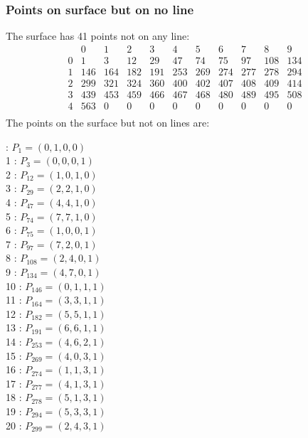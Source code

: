 \documentclass{article}
\begin{document}
{\subsubsection*{Points on surface but on no line}
The surface has 41 points not on any line:\\
$$
\begin{array}{r|*{10}{r}}
 & 0 & 1 & 2 & 3 & 4 & 5 & 6 & 7 & 8 & 9\\
\hline
0 & 1 & 3 & 12 & 29 & 47 & 74 & 75 & 97 & 108 & 134\\
1 & 146 & 164 & 182 & 191 & 253 & 269 & 274 & 277 & 278 & 294\\
2 & 299 & 321 & 324 & 360 & 400 & 402 & 407 & 408 & 409 & 414\\
3 & 439 & 453 & 459 & 466 & 467 & 468 & 480 & 489 & 495 & 508\\
4 & 563 & 0 & 0 & 0 & 0 & 0 & 0 & 0 & 0 & 0\\
\end{array}
$$
The points on the surface but not on lines are:\\
\begin{multicols}{2}
 : $P_{1}=( 0, 1, 0, 0 )$\\
1 : $P_{3}=( 0, 0, 0, 1 )$\\
2 : $P_{12}=( 1, 0, 1, 0 )$\\
3 : $P_{29}=( 2, 2, 1, 0 )$\\
4 : $P_{47}=( 4, 4, 1, 0 )$\\
5 : $P_{74}=( 7, 7, 1, 0 )$\\
6 : $P_{75}=( 1, 0, 0, 1 )$\\
7 : $P_{97}=( 7, 2, 0, 1 )$\\
8 : $P_{108}=( 2, 4, 0, 1 )$\\
9 : $P_{134}=( 4, 7, 0, 1 )$\\
10 : $P_{146}=( 0, 1, 1, 1 )$\\
11 : $P_{164}=( 3, 3, 1, 1 )$\\
12 : $P_{182}=( 5, 5, 1, 1 )$\\
13 : $P_{191}=( 6, 6, 1, 1 )$\\
14 : $P_{253}=( 4, 6, 2, 1 )$\\
15 : $P_{269}=( 4, 0, 3, 1 )$\\
16 : $P_{274}=( 1, 1, 3, 1 )$\\
17 : $P_{277}=( 4, 1, 3, 1 )$\\
18 : $P_{278}=( 5, 1, 3, 1 )$\\
19 : $P_{294}=( 5, 3, 3, 1 )$\\
20 : $P_{299}=( 2, 4, 3, 1 )$\\

\end{multicols}}
\end{document}
